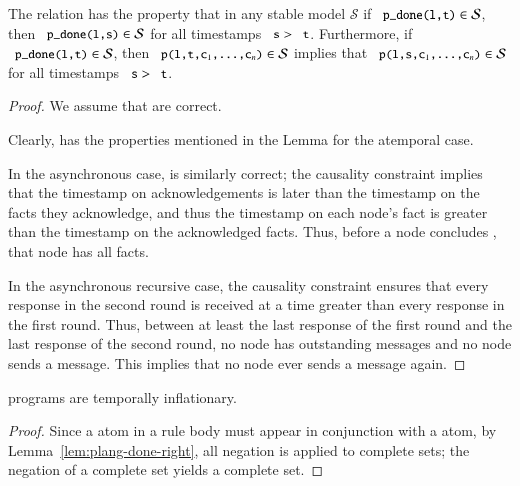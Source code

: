 \begin{lemma}[Sealing]
\label{lem:plang-done-right}
The relation  has the property that in any stable model $\mathcal{S}$ if $\dedalus{p_done(l,t)} \in \mathcal{S}$,  then $\dedalus{p_done(l,s)} \in \mathcal{S}$ for all timestamps $\dedalus{s} > \dedalus{t}$.  Furthermore, if $\dedalus{p_done(l,t)} \in \mathcal{S}$, then $\dedalus{p(l,t,c\sub{1},\ldots,c\sub{n})} \in \mathcal{S}$ implies that $\dedalus{p(l,s,c\sub{1},\ldots,c\sub{n})} \in \mathcal{S}$ for all timestamps $\dedalus{s} > \dedalus{t}$.
\end{lemma}
\begin{proof}
We assume that  are correct.

Clearly,  has the properties mentioned in the Lemma for the atemporal case.

In the asynchronous case,  is similarly correct; the causality constraint implies that the timestamp on acknowledgements is later than the timestamp on the facts they acknowledge, and thus the timestamp on each node's  fact is greater than the timestamp on the acknowledged facts.  Thus, before a node concludes , that node has all  facts.

In the asynchronous recursive case, the causality constraint ensures that every response in the second round is received at a time greater than every response in the first round.  Thus, between at least the last response of the first round and the last response of the second round, no node has outstanding messages and no node sends a message.  This implies that no node ever sends a message again.
\end{proof}

\begin{lemma}
\label{lem:plang-inflationary}
\plang programs are temporally inflationary.
\end{lemma}
\begin{proof}
Since a  atom in a rule body must appear in conjunction with a  atom, by Lemma~\ref{lem:plang-done-right}, all negation is applied to complete sets; the negation of a complete set yields a complete set.
\end{proof}


